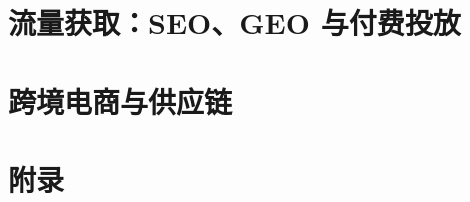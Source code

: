 \documentclass[UTF8, fontset=\NotesFontSet, 11pt, oneside, openany]{ctexbook}
\begin{document}
\part{流量获取：SEO、GEO 与付费投放}






\part{跨境电商与供应链}





\appendix
\part{附录}






\cleardoublepage
{}
{}

\end{document}
